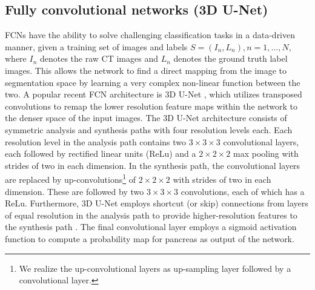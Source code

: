 \documentclass[a4paper]{spie}  %
\begin{document}
\subsection{Fully convolutional networks (3D U-Net)} FCNs have the ability to solve challenging classification tasks in a data-driven manner, given a training set of images and labels $S={(I_n,L_n ),n=1,\dots,N}$, where $I_n$ denotes the raw CT images and $L_n$ denotes the ground truth label images. This allows the network to find a direct mapping from the image to segmentation space by learning a very complex non-linear function between the two. A popular recent FCN architecture is 3D U-Net \cite{cciccek20163d}, which utilizes transposed convolutions to remap the lower resolution feature maps within the network to the denser space of the input images. The 3D U-Net architecture consists of symmetric analysis and synthesis paths with four resolution levels each. Each resolution level in the analysis path contains two $3\times3\times3$ convolutional layers, each followed by rectified linear units (ReLu) and a $2\times2\times2$ max pooling with strides of two in each dimension. In the synthesis path, the convolutional layers are replaced by up-convolutions\footnote{We realize the up-convolutional layers as up-sampling layer followed by a convolutional layer.} of $2\times2\times2$ with strides of two in each dimension. These are followed by two $3\times3\times3$ convolutions, each of which has a ReLu. Furthermore, 3D U-Net employs shortcut (or skip) connections from layers of equal resolution in the analysis path to provide higher-resolution features to the synthesis path \cite{cciccek20163d}. The final convolutional layer employs a sigmoid activation function to compute a probability map for pancreas as output of the network.
\end{document}
